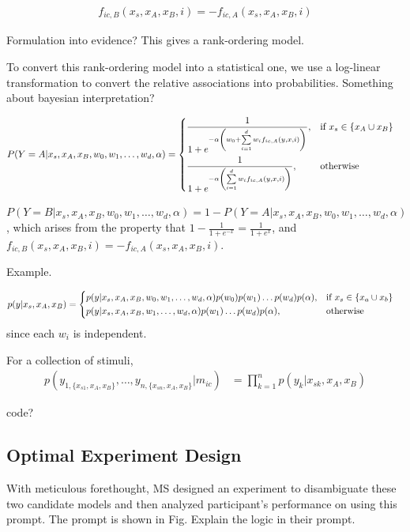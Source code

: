 \documentclass[11pt]{article}
\begin{document}
\begin{align}
f_{ic,B}(x_s, x_A, x_B, i) = -f_{ic,A}(x_s, x_A, x_B, i)
\end{align}

Formulation into evidence? This gives a rank-ordering model.

To convert this rank-ordering model into a statistical one, we use a log-linear transformation to convert the relative associations into probabilities. Something about bayesian interpretation?

\begin{align}
    P(Y=A| x_s, x_A, x_B, w_0, w_1, \dots, w_d, \alpha) &= 
        \begin{dcases}
            \frac{1}{1 + e^{-\alpha \left(w_0 + \sum \limits_{i=1}^d w_i f_{ic,A}(y, x, i)\right)}}, & \text{if } x_s \in \{x_A \cup x_B\}\\
            \frac{1}{1 + e^{-\alpha \left(\sum \limits_{i=1}^d w_i f_{ic,A}(y, x, i)\right)}}, & \text{otherwise }
        \end{dcases}
\end{align}

$P(Y=B| x_s, x_A, x_B, w_0, w_1, \dots, w_d, \alpha) = 1- P(Y=A| x_s, x_A, x_B, w_0, w_1, \dots, w_d, \alpha)$, which arises from the property that $1-\frac{1}{1+e^{-x}} = \frac{1}{1+e^x}$, and $f_{ic,B}(x_s, x_A, x_B, i) = -f_{ic,A}(x_s, x_A, x_B, i)$.

Example.

\begin{align}
    p(y | x_s, x_A, x_B) &=  
        \begin{dcases}
            p(y|x_s, x_A, x_B, w_0, w_1, \dots, w_d, \alpha) p(w_0) p(w_1) \dots p(w_d) p(\alpha), & \text{if } x_s \in \{x_a \cup x_b\}\\
            p(y|x_s, x_A, x_B, w_1, \dots, w_d, \alpha) p(w_1) \dots p(w_d) p(\alpha), & \text{otherwise}
        \end{dcases}
\end{align}
since each $w_i$ is independent.

For a collection of stimuli, 
\begin{align}
    p(y_{1,\{x_{s1}, x_A, x_B\}}, \dots, y_{n,\{x_{sn}, x_A, x_B\}} | m_{ic}) &=  \prod\limits_{k=1}^n p(y_k|x_{sk}, x_A, x_B) 
\end{align}

code?

\subsection{Optimal Experiment Design}
With meticulous forethought, MS designed an experiment to disambiguate these two candidate models and then analyzed participant's performance on using this prompt. The prompt is shown in Fig. Explain the logic in their prompt.
\end{document}
